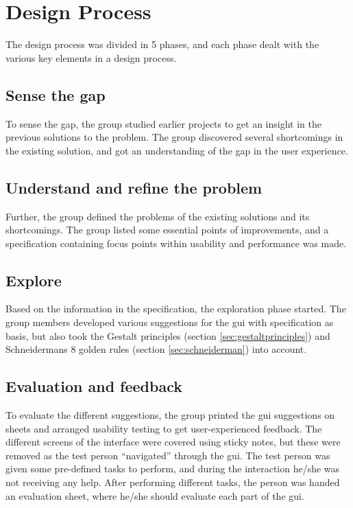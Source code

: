 \section{Design Process}
\label{sec:hcimethod}
The design process was divided in 5 phases, and each phase dealt with the various key elements in a design process.

\subsection{Sense the gap}
\label{sec:sensethegap}
To sense the gap, the group studied earlier projects to get an insight in the previous solutions to the problem. The group discovered several shortcomings in the existing solution, and got an understanding of the gap in the user experience.

\subsection{Understand and refine the problem}
Further, the group defined the problems of the existing solutions and its shortcomings. The group listed some essential points of improvements, and a specification containing focus points within usability and performance was made.

\subsection{Explore}
\label{sec:explore}
Based on the information in the specification, the exploration phase started. The group members developed various suggestions for the \acrshort{gui} with specification as basis, but also took the Gestalt principles (section \ref{sec:gestaltprinciples}) and Schneidermans 8 golden rules (section \ref{sec:schneiderman}) into account.

\subsection{Evaluation and feedback}
\label{sec:evalandfeedback}
To evaluate the different suggestions, the group printed the \acrshort{gui} suggestions on sheets and arranged usability testing to get user-experienced feedback. The different screens of the interface were covered using sticky notes, but these were removed as the test person ``navigated'' through the \acrshort{gui}. The test person was given some pre-defined tasks to perform, and during the interaction he/she was not receiving any help. After performing different tasks, the person was handed an evaluation sheet, where he/she should evaluate each part of the \acrshort{gui}.

